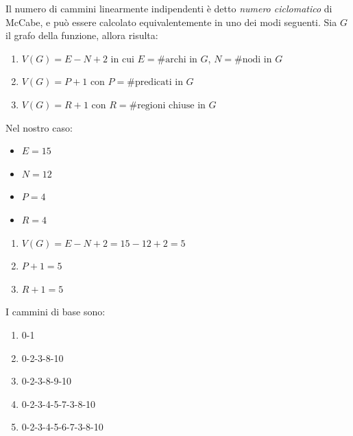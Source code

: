 \noindent\begin{minipage}[t]{0.65\linewidth}
	\vspace{0pt}
	Il numero di cammini linearmente indipendenti è detto \emph{numero ciclomatico} di McCabe, e può essere calcolato equivalentemente in uno dei modi seguenti. Sia $G$ il grafo della funzione, allora risulta:
	\begin{enumerate}
		\item $V(G) = E - N + 2$ in cui $E = \text{\#archi in } G$, $N = \text{\#nodi in } G$
		\item $V(G) = P + 1$ con $P = \text{\#predicati in } G$
		\item $V(G) = R + 1$ con $R = \text{\#regioni chiuse in } G$
	\end{enumerate}%
	Nel nostro caso:%
	\begin{itemize}
		\item $E = 15$
		\item $N = 12$
		\item $P = 4$
		\item $R = 4$
	\end{itemize}%
	\begin{enumerate}
		\item $V(G) = E - N + 2 = 15 - 12 + 2 = 5$
		\item $P + 1 = 5$
		\item $R + 1 = 5$
	\end{enumerate}%
	\noindent I cammini di base sono:
	\begin{enumerate}
		\item 0-1
		\item 0-2-3-8-10
		\item 0-2-3-8-9-10
		\item 0-2-3-4-5-7-3-8-10
		\item 0-2-3-4-5-6-7-3-8-10
	\end{enumerate}
\end{minipage}
\hfill
\noindent
